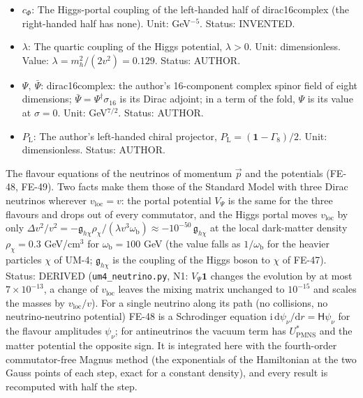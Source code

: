 \documentclass[
  10pt,
]{article}
\begin{document}
\begin{itemize}
  GeV. Status: AUTHOR.
\item
  \(c_\Phi\): The Higgs-portal coupling of the left-handed half of
  dirac16complex (the right-handed half has none). Unit: GeV\(^{-5}\).
  Status: INVENTED.
\item
  \(\lambda\): The quartic coupling of the Higgs potential,
  \(\lambda > 0\). Unit: dimensionless. Value:
  \(\lambda = m_h^2/(2v^2) = 0.129\). Status: AUTHOR.
\item
  \(\Psi,\ \bar\Psi\): dirac16complex: the author's 16-component complex
  spinor field of eight dimensions;
  \(\bar\Psi = \Psi^\dagger\sigma_{16}\) is its Dirac adjoint; in a term
  of the fold, \(\Psi\) is its value at \(\sigma = 0\). Unit:
  GeV\(^{7/2}\). Status: AUTHOR.
\item
  \(P_{\mathrm{L}}\): The author's left-handed chiral projector,
  \(P_{\mathrm{L}} = (\mathbf{1} - \Gamma_8)/2\). Unit: dimensionless.
  Status: AUTHOR.
\end{itemize}

The flavour equations of the neutrinos of momentum \(\vec p\) and the
potentials (FE-48, FE-49). Two facts make them those of the Standard
Model with three Dirac neutrinos wherever \(v_{\mathrm{loc}} = v\): the
portal potential \(V_\Psi\) is the same for the three flavours and drops
out of every commutator, and the Higgs portal moves \(v_{\mathrm{loc}}\)
by only
\(\Delta v^2/v^2 = -\mathfrak{g}_{h\chi}\rho_\chi/(\lambda v^3\omega_{\mathrm{b}}) \approx -10^{-50}\,\mathfrak{g}_{h\chi}\)
at the local dark-matter density \(\rho_\chi = 0.3\) GeV/cm\(^3\) for
\(\omega_{\mathrm{b}} = 100\) GeV (the value falls as
\(1/\omega_{\mathrm{b}}\) for the heavier particles \(\chi\) of UM-4;
\(\mathfrak{g}_{h\chi}\) is the coupling of the Higgs boson to \(\chi\)
of FE-47). Status: DERIVED (\texttt{um4\_neutrino.py}, N1:
\(V_\Psi\mathbf{1}\) changes the evolution by at most
\(7\times10^{-13}\), a change of \(v_{\mathrm{loc}}\) leaves the mixing
matrix unchanged to \(10^{-15}\) and scales the masses by
\(v_{\mathrm{loc}}/v\)). For a single neutrino along its path (no
collisions, no neutrino-neutrino potential) FE-48 is a Schrodinger
equation
\(\mathrm{i}\,\mathrm{d}\psi_\nu/\mathrm{d}r = \mathsf{H}\psi_\nu\) for
the flavour amplitudes \(\psi_\nu\); for antineutrinos the vacuum term
has \(U_{\mathrm{PMNS}}^*\) and the matter potential the opposite sign.
It is integrated here with the fourth-order commutator-free Magnus
method (the exponentials of the Hamiltonian at the two Gauss points of
each step, exact for a constant density), and every result is recomputed
with half the step.
\end{document}
